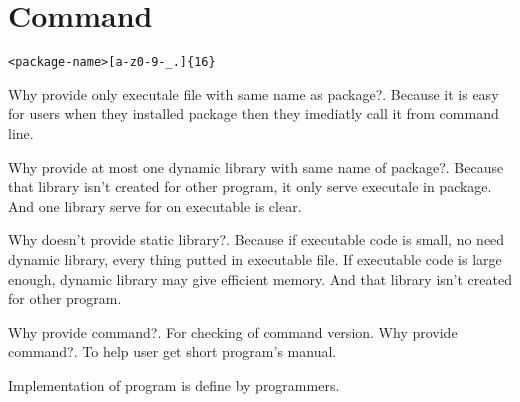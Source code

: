 \section{Command}

\begin{crules}
    \verb/<package-name>[a-z0-9-_.]{16}/
\end{crules}

Why provide only executale file with same name as package?.
Because it is easy for users when they installed package then they imediatly
call it from command line.

Why provide at most one dynamic library with same name of package?.
Because that library isn't created for other program, it only serve executale
in package. And one library serve for on executable is clear.

Why doesn't provide static library?. Because if executable code is small,
no need dynamic library, every thing putted in executable file.
If executable code is large enough, dynamic library may give efficient
memory. And that library isn't created for other program.

Why provide  command?. For checking of command version.
Why provide  command?. To help user get short program's manual.

Implementation of program is define by programmers.
